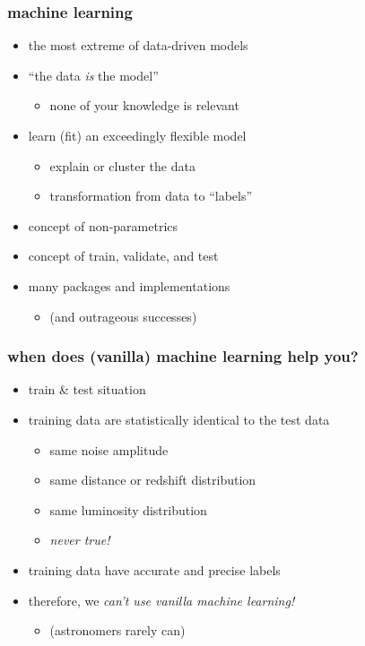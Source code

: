 \documentclass[pdftex]{beamer}
\begin{document}
\begin{frame}
  \frametitle{machine learning}
  \begin{itemize}
  \item the most extreme of data-driven models
  \item ``the data \emph{is} the model''
    \begin{itemize}
    \item none of your knowledge is relevant
    \end{itemize}
  \item learn (fit) an exceedingly flexible model
    \begin{itemize}
    \item explain or cluster the data
    \item transformation from data to ``labels''
    \end{itemize}
  \item concept of non-parametrics
  \item concept of train, validate, and test
  \item many packages and implementations
    \begin{itemize}
    \item (and outrageous successes)
    \end{itemize}
  \end{itemize}
\end{frame}

\begin{frame}
  \frametitle{when does (vanilla) machine learning help you?}
  \begin{itemize}
  \item train \& test situation
  \item training data are statistically identical to the test data
    \begin{itemize}
    \item same noise amplitude
    \item same distance or redshift distribution
    \item same luminosity distribution
    \item \emph{never true!}
    \end{itemize}
  \item training data have accurate and precise labels
  \item therefore, we \emph{can't use vanilla machine learning!}
    \begin{itemize}
    \item (astronomers rarely can)
    \end{itemize}
  \end{itemize}
\end{frame}
\end{document}
